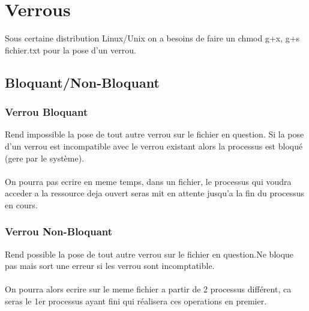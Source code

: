 \documentclass[a4paper,12pt,openany]{book}
\begin{document}
\chapter{Verrous}

Sous certaine distribution Linux/Unix on a besoins de faire un chmod g+x, g+s fichier.txt pour la pose d'un verrou.\\


\section{Bloquant/Non-Bloquant}


\subsection{Verrou Bloquant}

Rend impossible la pose de tout autre verrou sur le fichier en question. Si la pose d'un verrou est incompatible avec le verrou existant alors la processus est bloqué (gere par le système).\\
\\
On pourra pas ecrire en meme temps, dans un fichier, le processus qui voudra acceder a la ressource deja ouvert seras mit en attente jusqu'a la fin du processus en cours.\\


\subsection{Verrou Non-Bloquant}

Rend possible la pose de tout autre verrou sur le fichier en question.Ne bloque pas mais sort une erreur si les verrou sont incomptatible.\\
\\
On pourra alors ecrire sur le meme fichier a partir de 2 processus différent, ca seras le 1er processus ayant fini qui réalisera ces operations en premier.\\
\end{document}
